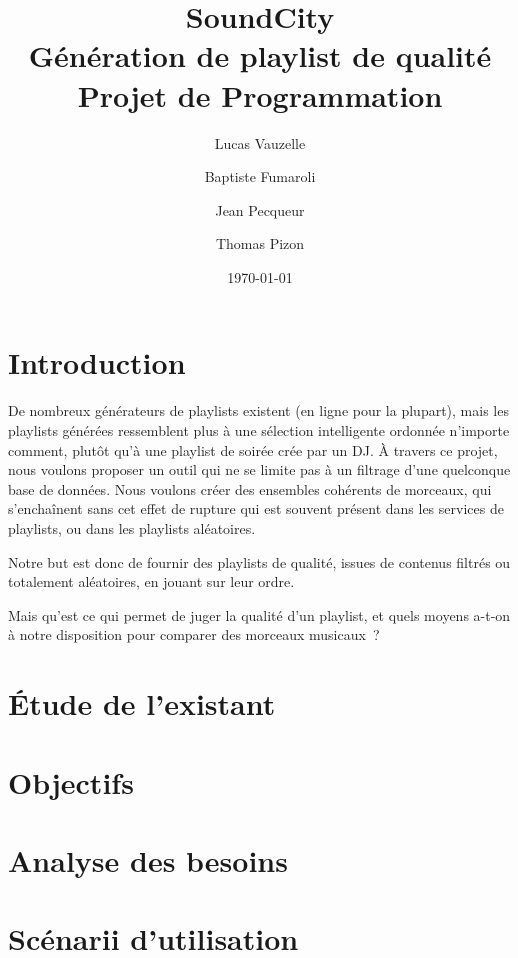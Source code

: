 \documentclass[a4paper, 11pt]{memoir}
\title{
  \huge{SoundCity} \\
  Génération de playlist de qualité \\
  Projet de Programmation
}
\author{Lucas Vauzelle \and Baptiste Fumaroli \and Jean Pecqueur \and Thomas Pizon}
\date{\today}
\begin{document}
\maketitle %
\clearpage

\frontmatter*

\chapter*{Introduction}

De nombreux générateurs de playlists existent (en ligne pour la plupart), mais
les playlists générées ressemblent plus à une sélection intelligente ordonnée
n'importe comment, plutôt qu'à une playlist de soirée crée par un DJ. À travers
ce projet, nous voulons proposer un outil qui ne se limite pas à un filtrage
d'une quelconque base de données. Nous voulons créer des ensembles cohérents de
morceaux, qui s'enchaînent sans cet effet de rupture qui est souvent présent
dans les services de playlists, ou dans les playlists aléatoires.

Notre but est donc de fournir des playlists de qualité, issues de contenus
filtrés ou totalement aléatoires, en jouant sur leur ordre.

Mais qu'est ce qui permet de juger la qualité d'un playlist, et quels moyens
a-t-on à notre disposition pour comparer des morceaux musicaux~?

\clearpage

\tableofcontents

\mainmatter*

\chapter{Étude de l'existant}

\chapter{Objectifs}

\chapter{Analyse des besoins}

\chapter{Scénarii d'utilisation}
\end{document}

